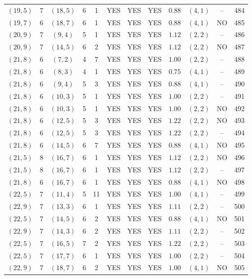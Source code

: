 \begin{longtable}{|c|c|c|c|c|c|c|c|c|c|c|c|}
$(19,5)$ & 7 & $(18,5)$ & 6 & 1 & YES & YES & YES & $0.88$ & $(4,1)$ & -- & 484\\
$(19,7)$ & 6 & $(18,7)$ & 6 & 1 & YES & YES & YES & $0.88$ & $(4,1)$ & NO & 485\\
$(20,9)$ & 7 & $(9,4)$ & 5 & 1 & YES & YES & YES & $1.12$ & $(2,2)$ & -- & 486\\
$(20,9)$ & 7 & $(14,5)$ & 6 & 2 & YES & YES & YES & $1.12$ & $(2,2)$ & NO & 487\\
$(21,8)$ & 6 & $(7,2)$ & 4 & 7 & YES & YES & YES & $1.00$ & $(2,2)$ & -- & 488\\
$(21,8)$ & 6 & $(8,3)$ & 4 & 1 & YES & YES & YES & $0.75$ & $(4,1)$ & -- & 489\\
$(21,8)$ & 6 & $(9,4)$ & 5 & 3 & YES & YES & YES & $0.88$ & $(4,1)$ & -- & 490\\
$(21,8)$ & 6 & $(10,3)$ & 5 & 1 & YES & YES & YES & $1.00$ & $(2,2)$ & -- & 491\\
$(21,8)$ & 6 & $(10,3)$ & 5 & 1 & YES & YES & YES & $1.00$ & $(2,2)$ & NO & 492\\
$(21,8)$ & 6 & $(12,5)$ & 5 & 3 & YES & YES & YES & $1.22$ & $(2,2)$ & NO & 493\\
$(21,8)$ & 6 & $(12,5)$ & 5 & 3 & YES & YES & YES & $1.22$ & $(2,2)$ & -- & 494\\
$(21,8)$ & 6 & $(14,5)$ & 6 & 7 & YES & YES & YES & $0.88$ & $(4,1)$ & NO & 495\\
$(21,5)$ & 8 & $(16,7)$ & 6 & 1 & YES & YES & YES & $1.12$ & $(2,2)$ & NO & 496\\
$(21,5)$ & 8 & $(16,7)$ & 6 & 1 & YES & YES & YES & $1.12$ & $(2,2)$ & -- & 497\\
$(21,8)$ & 6 & $(16,7)$ & 6 & 1 & YES & YES & YES & $0.88$ & $(4,1)$ & NO & 498\\
$(22,5)$ & 7 & $(11,4)$ & 5 & 11 & YES & YES & YES & $1.00$ & $(4,1)$ & -- & 499\\
$(22,9)$ & 7 & $(13,3)$ & 6 & 1 & YES & YES & YES & $1.11$ & $(2,2)$ & -- & 500\\
$(22,5)$ & 7 & $(14,5)$ & 6 & 2 & YES & YES & YES & $0.88$ & $(4,1)$ & NO & 501\\
$(22,9)$ & 7 & $(14,3)$ & 6 & 2 & YES & YES & YES & $1.11$ & $(2,2)$ & -- & 502\\
$(22,5)$ & 7 & $(16,5)$ & 7 & 2 & YES & YES & YES & $1.22$ & $(2,2)$ & -- & 503\\
$(22,5)$ & 7 & $(17,7)$ & 6 & 1 & YES & YES & YES & $1.00$ & $(2,2)$ & -- & 504\\
$(22,9)$ & 7 & $(18,7)$ & 6 & 2 & YES & YES & YES & $1.00$ & $(4,1)$ & NO & 505\\

\end{longtable}
